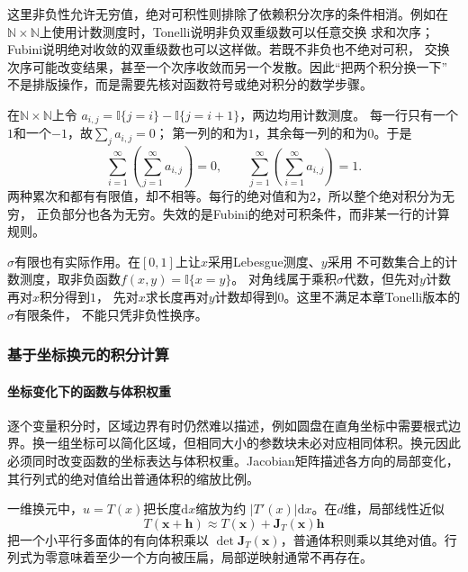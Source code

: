 这里非负性允许无穷值，绝对可积性则排除了依赖积分次序的条件相消。例如在
$\mathbb{N}\times\mathbb{N}$上使用计数测度时，Tonelli说明非负双重级数可以任意交换
求和次序；Fubini说明绝对收敛的双重级数也可以这样做。若既不非负也不绝对可积，
交换次序可能改变结果，甚至一个次序收敛而另一个发散。因此“把两个积分换一下”
不是排版操作，而是需要先核对函数符号或绝对积分的数学步骤。

\begin{example}[行列各自可加仍不足以换序]
\label{ex:analysis-iterated-sum-failure}
在$\mathbb N\times\mathbb N$上令
$a_{i,j}=\mathbb I\{j=i\}-\mathbb I\{j=i+1\}$，两边均用计数测度。
每一行只有一个$1$和一个$-1$，故$\sum_j a_{i,j}=0$；
第一列的和为$1$，其余每一列的和为$0$。于是
\[
 \sum_{i=1}^{\infty}\left(\sum_{j=1}^{\infty}a_{i,j}\right)=0,
 \qquad
 \sum_{j=1}^{\infty}\left(\sum_{i=1}^{\infty}a_{i,j}\right)=1.
\]
两种累次和都有有限值，却不相等。每行的绝对值和为$2$，所以整个绝对积分为无穷，
正负部分也各为无穷。失效的是Fubini的绝对可积条件，而非某一行的计算规则。
\end{example}

$\sigma$有限也有实际作用。在$[0,1]$上让$x$采用Lebesgue测度、$y$采用
不可数集合上的计数测度，取非负函数$f(x,y)=\mathbb I\{x=y\}$。
对角线属于乘积$\sigma$代数，但先对$y$计数再对$x$积分得到$1$，
先对$x$求长度再对$y$计数却得到$0$。这里不满足本章Tonelli版本的$\sigma$有限条件，
不能只凭非负性换序。

\subsubsection{基于坐标换元的积分计算}
\label{sec:analysis-coordinate-change-integral-applications}
\paragraph{坐标变化下的函数与体积权重}
逐个变量积分时，区域边界有时仍然难以描述，例如圆盘在直角坐标中需要根式边界。换一组坐标可以简化区域，但相同大小的参数块未必对应相同体积。换元因此必须同时改变函数的坐标表达与体积权重。Jacobian矩阵描述各方向的局部变化，其行列式的绝对值给出普通体积的缩放比例。

一维换元中，$u=T(x)$把长度$\mathrm{d}x$缩放为约 $|T'(x)|\mathrm{d}x$。在$d$维，局部线性近似
\[   T(\bm{x}+\bm{h})   \approx   T(\bm{x})+\bm{J}_T(\bm{x})\bm{h} \]
把一个小平行多面体的有向体积乘以 $\det\bm{J}_T(\bm{x})$，普通体积则乘以其绝对值。行列式为零意味着至少一个方向被压扁，局部逆映射通常不再存在。

